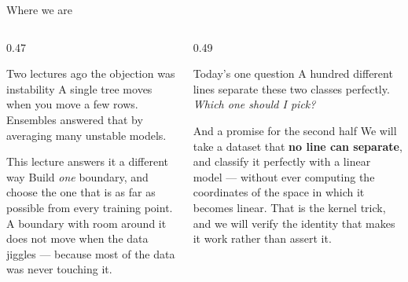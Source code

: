 \documentclass[aspectratio=169]{beamer}
\begin{document}
\begin{frame}[shrink=5]{Where we are}
  \begin{columns}[T]
    \begin{column}{0.47\textwidth}
      \begin{block}{Two lectures ago the objection was instability}
        A single tree moves when you move a few rows. Ensembles answered that
        by averaging many unstable models.
      \end{block}
      \begin{block}{This lecture answers it a different way}
        Build \emph{one} boundary, and choose the one that is as far as
        possible from every training point. A boundary with room around it
        does not move when the data jiggles --- because most of the data was
        never touching it.
      \end{block}
    \end{column}
    \begin{column}{0.49\textwidth}
      \begin{exampleblock}{Today's one question}
        A hundred different lines separate these two classes perfectly.
        \emph{Which one should I pick?}
      \end{exampleblock}
      \begin{alertblock}{And a promise for the second half}
        We will take a dataset that \textbf{no line can separate}, and
        classify it perfectly with a linear model --- without ever computing
        the coordinates of the space in which it becomes linear. That is the
        kernel trick, and we will verify the identity that makes it work
        rather than assert it.
      \end{alertblock}
    \end{column}
  \end{columns}
\end{frame}
\end{document}
